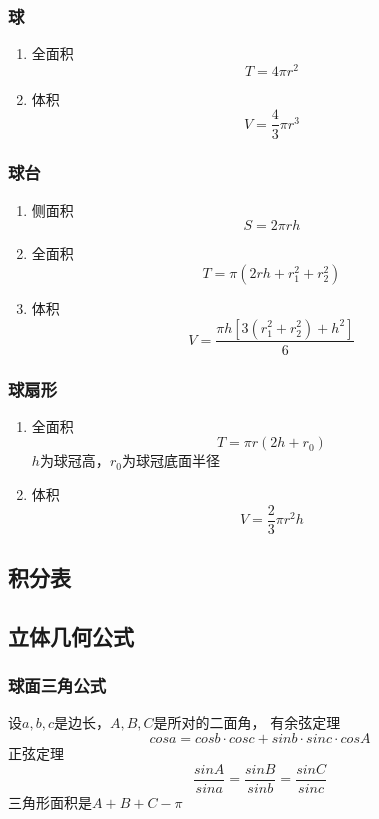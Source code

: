 \documentclass[a4paper]{article}
\begin{document}
\subsubsection{球}

\begin{enumerate}
	\item 全面积
	$$T=4\pi r^2$$
	\item 体积
	$$V=\frac{4}{3}\pi r^3$$
\end{enumerate}

\subsubsection{球台}

\begin{enumerate}
	\item 侧面积
	$$S=2\pi rh$$
	\item 全面积
	$$T=\pi(2rh+r_1^2+r_2^2)$$
	\item 体积
	$$V=\frac{\pi h[3(r_1^2+r_2^2)+h^2]}{6}$$
\end{enumerate}

\subsubsection{球扇形}

\begin{enumerate}
	\item 全面积
	$$T=\pi r(2h+r_0)$$
	$h$为球冠高，$r_0$为球冠底面半径
	\item 体积
	$$V=\frac{2}{3}\pi r^2h$$
\end{enumerate}

\subsection{积分表}


\subsection{立体几何公式}

\subsubsection{球面三角公式}

设$a, b, c$是边长，$A, B, C$是所对的二面角，
有余弦定理$$cos a = cos b \cdot cos c + sin b \cdot sin c \cdot cos A$$
正弦定理$$\frac{sin A}{sin a} = \frac{sin B}{sin b} = \frac{sin C}{sin c}$$
三角形面积是$A + B + C - \pi$
\end{document}
